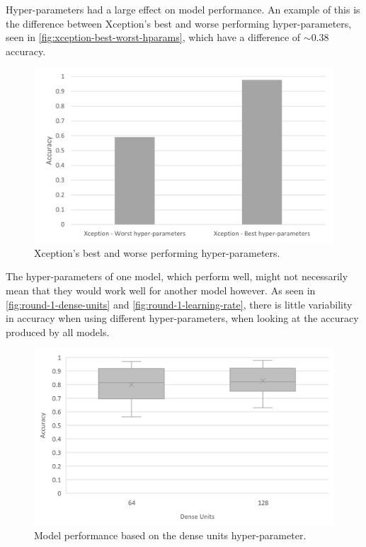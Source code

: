 Hyper-parameters had a large effect on model performance. An example of this is the difference between Xception's best and worse performing hyper-parameters, seen in \autoref{fig:xception-best-worst-hparams}, which have a difference of $\sim$0.38 accuracy.

\begin{figure}[H]
    \centering
    \includegraphics[width=\textwidth]{figures/xception-best-worst-hparams.png}
    \caption{Xception's best and worse performing hyper-parameters.}
    \label{fig:xception-best-worst-hparams}
\end{figure}

The hyper-parameters of one model, which perform well, might not necessarily mean that they would work well for another model however. As seen in \autoref{fig:round-1-dense-units} and \autoref{fig:round-1-learning-rate}, there is little variability in accuracy when using different hyper-parameters, when looking at the accuracy produced by all models.

\begin{figure}[H]
    \centering
    \includegraphics[width=\textwidth]{figures/round-1-dense-units.png}
    \caption{Model performance based on the dense units hyper-parameter.}
    \label{fig:round-1-dense-units}
\end{figure}

